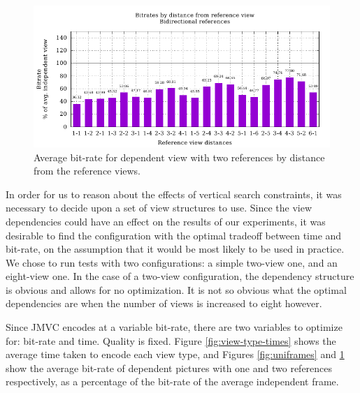 \documentclass{sig-alternate-05-2015}
\begin{document}
\begin{figure}[h]
\centering
\includegraphics[scale=.68]{figures/motion_vector_data_unconstrained_bidirectional.pdf}
\caption{
Average bit-rate for dependent view with two references by distance from the
reference views.
}
\label{fig:biframes}
\end{figure}

In order for us to reason about the effects of vertical search constraints, it
was necessary to decide upon a set of view structures to use. Since the
view dependencies could have an effect on the results of our experiments, it was
desirable to find the configuration with the optimal tradeoff between time and
bit-rate, on the assumption that it would be most likely to be used in
practice. We chose to run tests with two configurations: a simple two-view one,
and an eight-view one. In the case of a two-view configuration, the dependency
structure is obvious and allows for no optimization. It is not so obvious what
the optimal dependencies are when the number of views is increased to eight
however.

Since JMVC encodes at a variable bit-rate, there are two variables to optimize
for: bit-rate and time. Quality is fixed. Figure \ref{fig:view-type-times} shows
the average time taken to encode each view type, and Figures \ref{fig:uniframes}
and \ref{fig:biframes} show the average bit-rate of dependent pictures with one
and two references respectively, as a percentage of the bit-rate of
the average independent frame.
\end{document}
